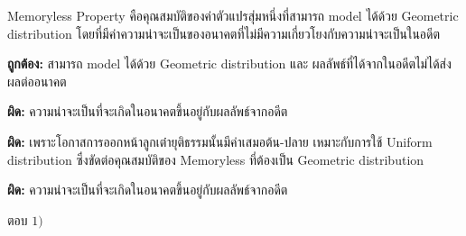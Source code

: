 \documentclass[11pt]{scrartcl}
\begin{document}
\begin{solutionbox}
  Memoryless Property คือคุณสมบัติของค่าตัวแปรสุ่มหนึ่งที่สามารถ model ได้ด้วย Geometric distribution โดยที่มีค่าความน่าจะเป็นของอนาคตที่ไม่มีความเกี่ยวโยงกับความน่าจะเป็นในอดีต
  \begin{substmt}
    \item \textbf{ถูกต้อง:} สามารถ model ได้ด้วย Geometric distribution และ ผลลัพธ์ที่ได้จากในอดีตไม่ได้ส่งผลต่ออนาคต
    \item \textbf{ผิด:} ความน่าจะเป็นที่จะเกิดในอนาคตขึ้นอยู่กับผลลัพธ์จากอดีต
    \item \textbf{ผิด:} เพราะโอกาสการออกหน้าลูกเต๋ายุติธรรมนั้นมีค่าเสมอต้น-ปลาย เหมาะกับการใช้ Uniform distribution 
    ซึ่งขัดต่อคุณสมบัติของ Memoryless ที่ต้องเป็น Geometric distribution
    \item \textbf{ผิด:} ความน่าจะเป็นที่จะเกิดในอนาคตขึ้นอยู่กับผลลัพธ์จากอดีต
  \end{substmt}
  
  ตอบ $\boxed{1)}$
\end{solutionbox}
\end{document}

